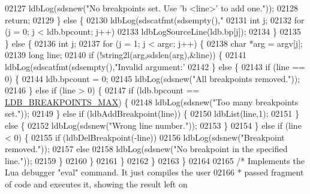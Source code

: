 \begin{DoxyCode}
{{{{{{{{{{{{{{{{{{02127             ldbLog(sdsnew(\textcolor{stringliteral}{"No breakpoints set. Use 'b <line>' to add one."}));
02128             \textcolor{keywordflow}{return};
02129         \} \textcolor{keywordflow}{else} \{
02130             ldbLog(sdscatfmt(sdsempty(),\textcolor{stringliteral}{"%
02131             \textcolor{keywordtype}{int} j;
02132             \textcolor{keywordflow}{for} (j = 0; j < ldb.bpcount; j++)
02133                 ldbLogSourceLine(ldb.bp[j]);
02134         \}
02135     \} \textcolor{keywordflow}{else} \{
02136         \textcolor{keywordtype}{int} j;
02137         \textcolor{keywordflow}{for} (j = 1; j < argc; j++) \{
02138             \textcolor{keywordtype}{char} *arg = argv[j];
02139             \textcolor{keywordtype}{long} line;
02140             \textcolor{keywordflow}{if} (!string2l(arg,sdslen(arg),&line)) \{
02141                 ldbLog(sdscatfmt(sdsempty(),\textcolor{stringliteral}{"Invalid argument:'%
02142             \} \textcolor{keywordflow}{else} \{
02143                 \textcolor{keywordflow}{if} (line == 0) \{
02144                     ldb.bpcount = 0;
02145                     ldbLog(sdsnew(\textcolor{stringliteral}{"All breakpoints removed."}));
02146                 \} \textcolor{keywordflow}{else} \textcolor{keywordflow}{if} (line > 0) \{
02147                     \textcolor{keywordflow}{if} (ldb.bpcount == \hyperlink{scripting_8c_a4f3000cf3b5955f8134bfcd2fa340db3}{LDB\_BREAKPOINTS\_MAX}) \{
02148                         ldbLog(sdsnew(\textcolor{stringliteral}{"Too many breakpoints set."}));
02149                     \} \textcolor{keywordflow}{else} \textcolor{keywordflow}{if} (ldbAddBreakpoint(line)) \{
02150                         ldbList(line,1);
02151                     \} \textcolor{keywordflow}{else} \{
02152                         ldbLog(sdsnew(\textcolor{stringliteral}{"Wrong line number."}));
02153                     \}
02154                 \} \textcolor{keywordflow}{else} \textcolor{keywordflow}{if} (line < 0) \{
02155                     \textcolor{keywordflow}{if} (ldbDelBreakpoint(-line))
02156                         ldbLog(sdsnew(\textcolor{stringliteral}{"Breakpoint removed."}));
02157                     \textcolor{keywordflow}{else}
02158                         ldbLog(sdsnew(\textcolor{stringliteral}{"No breakpoint in the specified line."}));
02159                 \}
02160             \}
02161         \}
02162     \}
02163 \}
02164 
02165 \textcolor{comment}{/* Implements the Lua debugger "eval" command. It just compiles the user}
02166 \textcolor{comment}{ * passed fragment of code and executes it, showing the result left on}
}}}}}}}}}}}}}}}}}}}}
\end{DoxyCode}
